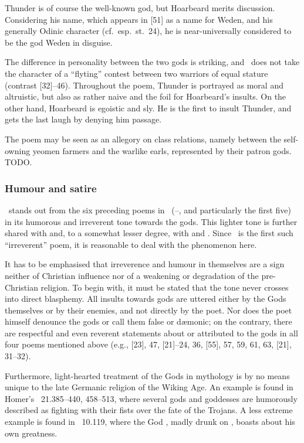 Thunder is of course the well-known god, but Hoarbeard merits discussion.  Considering his name, which appears in [51] as a name for Weden, and his generally Odinic character (cf.~esp.~st.~24), he is near-universally considered to be the god Weden in disguise.

The difference in personality between the two gods is striking, and \Harbardsljod\ does not take the character of a “flyting” contest between two warriors of equal stature (contrast [32]--46).  Throughout the poem, Thunder is portrayed as moral and altruistic, but also as rather naive and the foil for Hoarbeard’s insults.  On the other hand, Hoarbeard is egoistic and sly.  He is the first to insult Thunder, and gets the last laugh by denying him passage.

The poem may be seen as an allegory on class relations, namely between the self-owning yeomen farmers and the warlike earls, represented by their patron gods.  TODO.

\subsubsection{Humour and satire}

\Harbardsljod\ stands out from the six preceding poems in \Regius\ (--, and particularly the first five) in its humorous and irreverent tone towards the gods.  This lighter tone is further shared with  and, to a somewhat lesser degree, with  and .  Since \Harbardsljod\ is the first such “irreverent” poem, it is reasonable to deal with the phenomenon here.

It has to be emphasised that irreverence and humour in themselves are a sign neither of Christian influence nor of a weakening or degradation of the pre-Christian religion.  To begin with, it must be stated that the tone never crosses into direct blasphemy.  All insults towards gods are uttered either by the Gods themselves or by their enemies, and not directly by the poet.  Nor does the poet himself denounce the gods or call them false or dæmonic; on the contrary, there are respectful and even reverent statements about or attributed to the gods in all four poems mentioned above (e.g., [23], 47, [21]--24, 36, [55], 57, 59, 61, 63, [21], 31--32).

Furthermore, light-hearted treatment of the Gods in mythology is by no means unique to the late Germanic religion of the Wiking Age.  An example is found in Homer’s \Iliad\ 21.385--440, 458--513, where several gods and goddesses are humorously described as fighting with their fists over the fate of the Trojans.  A less extreme example is found in \Rigveda\ 10.119, where the God , madly drunk on , boasts about his own greatness.

